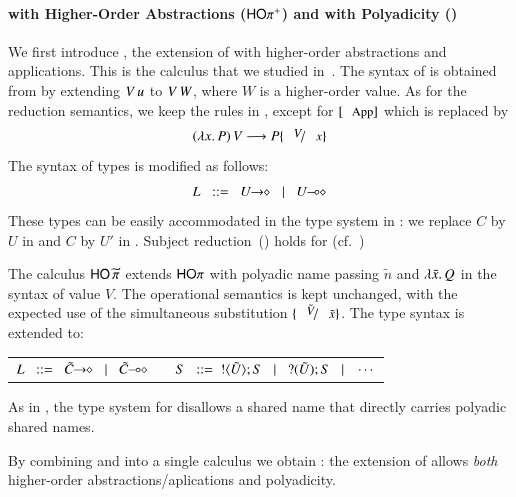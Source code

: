 \documentclass[runningheads]{llncs}
\begin{document}
{\paragraph{\HOp with Higher-Order Abstractions ($\mathsf{HO\pi^{+}}$) and 
with Polyadicity (\PHOp)
}
We first introduce \HOpp, the  extension of \HOp with higher-order abstractions and applications.
This is the calculus that we studied in~\cite{characteristic_bis}. The syntax of \HOpp is obtained 
from   by extending
$V\, {u}$ to $V\, {W}$, where  $W$ is a higher-order value. 
As for the reduction semantics, we keep the rules in , except for 
 $\orule{App}$ which is replaced by 
\[
	\appl{(\abs{x}{P})}{V} \red P \subst{V}{x}
\]
The syntax of types is modified as follows: %
$$
		L \bnfis \shot{U} \bnfbar \lhot{U}
$$
These types can be easily accommodated in the type system 
in :
we replace $C$ by $U$ in  and $C$ by $U'$ in . Subject
reduction~() holds for \HOpp (cf.~\cite{characteristic_bis})

%
The calculus  
$\mathsf{HO}\,{\widetilde{\pi}}$ 
extends $\mathsf{HO}\pi$ 
with polyadic name passing $\tilde{n}$ and $\lambda \tilde{x}.\,Q$ in the syntax 
of value $V$. 
The operational semantics is kept unchanged, with the expected use of the simultaneous substitution $\subst{\tilde{V}}{\tilde{x}}$.
The type syntax is extended to: 
%
\begin{center}
	\begin{tabular}{c}
	$	L \bnfis \shot{\tilde{C}} \bnfbar \lhot{\tilde{C}}
		\quad\quad
		S \bnfis  \btout{\tilde{U}} S \bnfbar \btinp{\tilde{U}} S \bnfbar \cdots$
	\end{tabular}
\end{center}
%
As in \cite{tlca07,MostrousY15},
the type system for \PHOp 
disallows a shared name that directly carries polyadic
shared names.

By combining \HOpp and \PHOp into a single calculus we obtain \PHOpp:
the extension of \HOp allows \emph{both} higher-order
abstractions/aplications and polyadicity.


}
\end{document}
